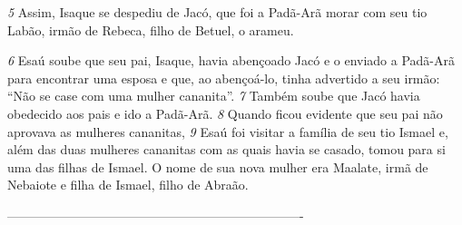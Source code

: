 \bigskip
\textit{\tiny 5}
Assim, Isaque se despediu de Jacó, que foi a Padã-Arã morar com seu tio
Labão, irmão de Rebeca, filho de Betuel, o arameu.

\bigskip
\textit{\tiny 6}
Esaú soube que seu pai, Isaque, havia abençoado Jacó e o enviado a Padã-Arã
para encontrar uma esposa e que, ao abençoá-lo, tinha advertido a seu irmão:
“Não se case com uma mulher cananita”. 
\textit{\tiny 7}
Também soube que Jacó havia
obedecido aos pais e ido a Padã-Arã. 
\textit{\tiny 8}
Quando ficou evidente que seu pai não
aprovava as mulheres cananitas, 
\textit{\tiny 9}
Esaú foi visitar a família de seu tio Ismael e,
além das duas mulheres cananitas com as quais havia se casado, tomou para si
uma das filhas de Ismael. O nome de sua nova mulher era Maalate, irmã de
Nebaiote e filha de Ismael, filho de Abraão.

----------------------------------------------------------------------
